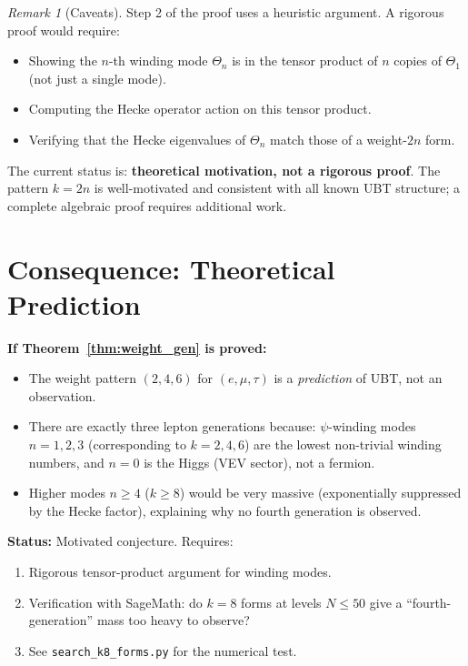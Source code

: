 \documentclass[12pt,a4paper]{article}
\theoremstyle{definition}
\theoremstyle{remark}
\newtheorem{remark}[theorem]{Remark}
\begin{document}
\begin{remark}[Caveats]
\label{rem:caveats}
Step 2 of the proof uses a heuristic argument.  A rigorous proof would
require:
\begin{itemize}
  \item Showing the $n$-th winding mode $\Theta_n$ is in the tensor
        product of $n$ copies of $\Theta_1$ (not just a single mode).
  \item Computing the Hecke operator action on this tensor product.
  \item Verifying that the Hecke eigenvalues of $\Theta_n$ match those
        of a weight-$2n$ form.
\end{itemize}
The current status is: \textbf{theoretical motivation, not a rigorous proof}.
The pattern $k = 2n$ is well-motivated and consistent with all known
UBT structure; a complete algebraic proof requires additional work.
\end{remark}

\section{Consequence: Theoretical Prediction}
\label{sec:consequence}

\begin{resultbox}
\textbf{If Theorem~\ref{thm:weight_gen} is proved:}
\begin{itemize}
  \item The weight pattern $(2, 4, 6)$ for $(e, \mu, \tau)$ is
        a \emph{prediction} of UBT, not an observation.
  \item There are exactly three lepton generations because:
        $\psi$-winding modes $n = 1, 2, 3$ (corresponding to
        $k = 2, 4, 6$) are the lowest non-trivial winding numbers,
        and $n = 0$ is the Higgs (VEV sector), not a fermion.
  \item Higher modes $n \geq 4$ ($k \geq 8$) would be very massive
        (exponentially suppressed by the Hecke factor), explaining
        why no fourth generation is observed.
\end{itemize}

\textbf{Status:} Motivated conjecture.  Requires:
\begin{enumerate}
  \item Rigorous tensor-product argument for winding modes.
  \item Verification with SageMath: do $k=8$ forms at levels $N \leq 50$
        give a ``fourth-generation'' mass too heavy to observe?
  \item See \texttt{search\_k8\_forms.py} for the numerical test.
\end{enumerate}
\end{resultbox}
\end{document}
